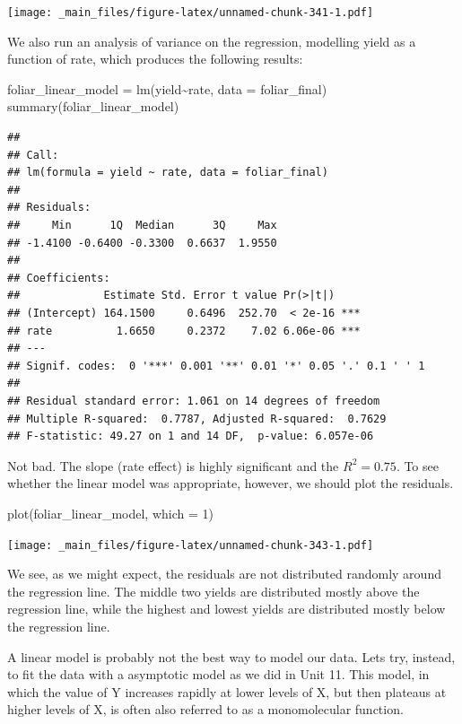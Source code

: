 \documentclass[
]{book}
\newenvironment{Shaded}{\begin{snugshade}}{\end{snugshade}}
\newcommand{\AttributeTok}[1]{\textcolor[rgb]{0.77,0.63,0.00}{#1}}
\newcommand{\DecValTok}[1]{\textcolor[rgb]{0.00,0.00,0.81}{#1}}
\newcommand{\FunctionTok}[1]{\textcolor[rgb]{0.00,0.00,0.00}{#1}}
\newcommand{\NormalTok}[1]{#1}
\newcommand{\OtherTok}[1]{\textcolor[rgb]{0.56,0.35,0.01}{#1}}
\newcommand{\SpecialCharTok}[1]{\textcolor[rgb]{0.00,0.00,0.00}{#1}}
\begin{document}
\texttt{[image: \_main\_files/figure-latex/unnamed-chunk-341-1.pdf]}

We also run an analysis of variance on the regression, modelling yield as a function of rate, which produces the following results:

\begin{Shaded}
\begin{Highlighting}[]
\NormalTok{foliar\_linear\_model }\OtherTok{=} \FunctionTok{lm}\NormalTok{(yield}\SpecialCharTok{\textasciitilde{}}\NormalTok{rate, }\AttributeTok{data =}\NormalTok{ foliar\_final)}
\FunctionTok{summary}\NormalTok{(foliar\_linear\_model)}
\end{Highlighting}
\end{Shaded}

\begin{verbatim}
## 
## Call:
## lm(formula = yield ~ rate, data = foliar_final)
## 
## Residuals:
##     Min      1Q  Median      3Q     Max 
## -1.4100 -0.6400 -0.3300  0.6637  1.9550 
## 
## Coefficients:
##             Estimate Std. Error t value Pr(>|t|)    
## (Intercept) 164.1500     0.6496  252.70  < 2e-16 ***
## rate          1.6650     0.2372    7.02 6.06e-06 ***
## ---
## Signif. codes:  0 '***' 0.001 '**' 0.01 '*' 0.05 '.' 0.1 ' ' 1
## 
## Residual standard error: 1.061 on 14 degrees of freedom
## Multiple R-squared:  0.7787, Adjusted R-squared:  0.7629 
## F-statistic: 49.27 on 1 and 14 DF,  p-value: 6.057e-06
\end{verbatim}

Not bad. The slope (rate effect) is highly significant and the \(R^2 = 0.75\). To see whether the linear model was appropriate, however, we should plot the residuals.

\begin{Shaded}
\begin{Highlighting}[]
\FunctionTok{plot}\NormalTok{(foliar\_linear\_model, }\AttributeTok{which =} \DecValTok{1}\NormalTok{)}
\end{Highlighting}
\end{Shaded}

\texttt{[image: \_main\_files/figure-latex/unnamed-chunk-343-1.pdf]}

We see, as we might expect, the residuals are not distributed randomly around the regression line. The middle two yields are distributed mostly above the regression line, while the highest and lowest yields are distributed mostly below the regression line.

A linear model is probably not the best way to model our data. Lets try, instead, to fit the data with a asymptotic model as we did in Unit 11. This model, in which the value of Y increases rapidly at lower levels of X, but then plateaus at higher levels of X, is often also referred to as a monomolecular function.
\end{document}

